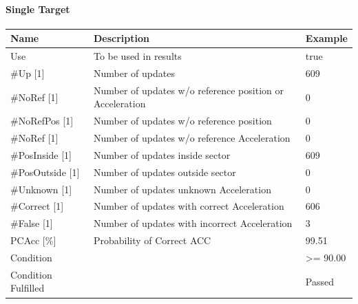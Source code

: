 \paragraph{Single Target}

\begin{center}
 \begin{table}[H]
  \begin{tabularx}{\textwidth}{ | l | X |  l | }
    \hline
    \textbf{Name} & \textbf{Description} & \textbf{Example} \\ \hline
    Use & To be used in results & true \\ \hline
    \#Up [1] & Number of updates & 609 \\ \hline
    \#NoRef [1] & Number of updates w/o reference position or Acceleration & 0 \\ \hline
    \#NoRefPos [1] & Number of updates w/o reference position  & 0 \\ \hline
    \#NoRef [1] & Number of updates w/o reference Acceleration & 0 \\ \hline
    \#PosInside [1] & Number of updates inside sector & 609 \\ \hline
    \#PosOutside [1] & Number of updates outside sector & 0 \\ \hline
    \#Unknown [1] & Number of updates unknown Acceleration & 0 \\ \hline
    \#Correct [1] & Number of updates with correct Acceleration & 606 \\ \hline
    \#False [1] & Number of updates with incorrect Acceleration & 3 \\ \hline
    PCAcc [\%] & Probability of Correct ACC & 99.51 \\ \hline
    Condition &  & >= 90.00 \\ \hline
    Condition Fulfilled &  & Passed \\ \hline
\end{tabularx}
\end{table}
\end{center}
